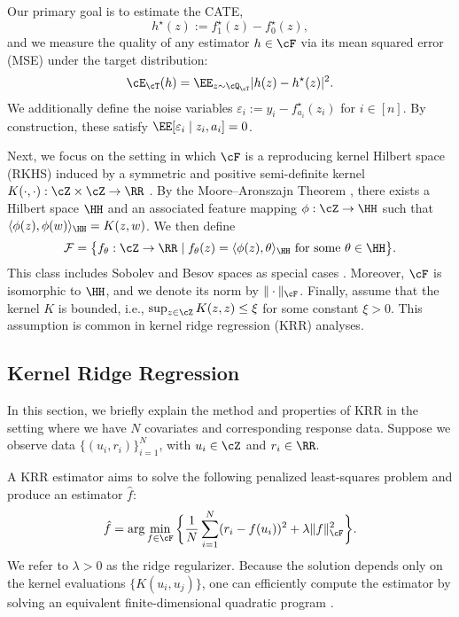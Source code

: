 \documentclass[12pt,a4paper,pdftex,onepage]{article}
\begin{document}
Our primary goal is to estimate the CATE,
\[
h^\star(z) := f_1^\star(z) - f_0^\star(z),
\]
and we measure the quality of any estimator \(h \in \cF\) via its mean squared error (MSE) under the target distribution:
\[
\cE_{\cT}(h) = \EE_{z \sim \cQ_\cT}|h(z) - h^\star(z)|^2.
\]
We additionally define the noise variables \(\varepsilon_i := y_i - f^\star_{a_i}(z_i)\) for \(i \in [n]\).  
By construction, these satisfy \(\EE[\varepsilon_i \mid z_i,a_i] = 0\).

Next, we focus on the setting in which \(\cF\) is a reproducing kernel Hilbert space (RKHS) induced by a symmetric and positive semi-definite kernel \(K(\cdot,\cdot): \cZ \times \cZ \to \RR\) \citep{paulsen2016introduction}.  
By the Moore--Aronszajn Theorem \citep{aronszajn1950theory}, there exists a Hilbert space \(\HH\) and an associated feature mapping \(\phi: \cZ \to \HH\) such that \(\langle \phi(z), \phi(w)\rangle_{\HH} = K(z,w)\).  
We then define
\[
\mathcal{F} = \bigl\{
f_\theta: \cZ \to \RR 
\mid 
f_\theta(z) = \langle \phi(z), \theta \rangle_{\HH}
\text{ for some } \theta \in \HH 
\bigr\}.
\]
This class includes Sobolev and Besov spaces as special cases \citep{wainwright2019high,fischer2020sobolev}.  
Moreover, \(\cF\) is isomorphic to \(\HH\), and we denote its norm by \(\|\cdot\|_{\cF}\).  
Finally, assume that the kernel \(K\) is bounded, i.e., $\sup_{z \in \cZ} K(z,z) \leq \xi$
for some constant \(\xi > 0\).  
This assumption is common in kernel ridge regression (KRR) analyses. 


\subsection{Kernel Ridge Regression}\label{section; preliminaries kernel ridge regression}

In this section, we briefly explain the method and properties of KRR in the setting where we have $N$ covariates and corresponding response data.  
Suppose we observe data $\{(u_i, r_i)\}_{i=1}^N$, with \(u_i \in \cZ\) and \(r_i \in \RR\).

A KRR estimator aims to solve the following penalized least-squares problem and produce an estimator \(\hat{f}\):
\begin{align}\label{equation; KRR program}
\hat{f}=  \arg \min_{f \in \cF} 
\bigg\{
\frac{1}{N}\sum_{i=1}^N (r_i - f(u_i))^2 + \lambda \| f\|_{\cF}^2
\bigg\}
.
\end{align}
We refer to \(\lambda>0\) as the ridge regularizer.  
Because the solution depends only on the kernel evaluations \(\{K(u_i, u_j)\}\), one can efficiently compute the estimator by solving an equivalent finite-dimensional quadratic program \citep{wainwright2019high}.  
\end{document}
